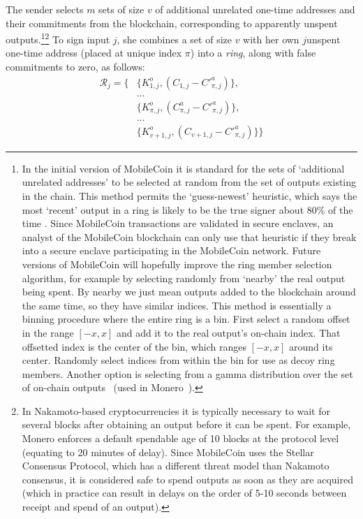 The sender selects $m$ sets of size $v$ of additional unrelated one-time addresses and their commitments from the blockchain, corresponding to apparently unspent outputs.\footnote{\label{input-selection}In the initial version of MobileCoin it is standard for the sets of `additional unrelated addresses' to be selected at random from the set of outputs existing in the chain. This method permits the `guess-newest' heuristic, which says the most `recent' output in a ring is likely to be the true signer about 80\% of the time \cite{AnalysisOfLinkability}. Since MobileCoin transactions are validated in secure enclaves, an analyst of the MobileCoin blockchain can only use that heuristic if they break into a secure enclave participating in the MobileCoin network. Future versions of MobileCoin will hopefully improve the ring member selection algorithm, for example by selecting randomly from `nearby' the real output being spent. By nearby we just mean outputs added to the blockchain around the same time, so they have similar indices. This method is essentially a binning procedure where the entire ring is a bin. First select a random offset in the range $[-x, x]$ and add it to the real output's on-chain index. That offsetted index is the center of the bin, which ranges $[-x, x]$ around its center. Randomly select indices from within the bin for use as decoy ring members. Another option is selecting from a gamma distribution over the set of on-chain outputs~\cite{AnalysisOfLinkability} (used in Monero~\cite{ztm-2}).}\footnote{In Nakamoto-based cryptocurrencies it is typically necessary to wait for several blocks after obtaining an output before it can be spent. For example, Monero enforces a default spendable age of 10 blocks at the protocol level~\cite{ztm-2} (equating to 20 minutes of delay). Since MobileCoin uses the Stellar Consensus Protocol, which has a different threat model than Nakamoto consensus, it is considered safe to spend outputs as soon as they are acquired (which in practice can result in delays on the order of 5-10 seconds between receipt and spend of an output).} To sign input $j$, she combines a set of size $v$ with her own $j$\nth unspent one-time address (placed at unique index $\pi$) into a {\em ring}, along with false commitments to zero, as follows:\vspace{.175cm}
\begin{align*}
    \mathcal{R}_j = \{&\{K^o_{1, j}, (C_{1, j} - C'^a_{\pi, j})\}, \\
    &... \\
    &\{ K^o_{\pi, j}, (C^a_{\pi, j} - C'^a_{\pi, j})\}, \\
    &... \\
    &\{ K^o_{v+1, j}, (C_{v+1, j} - C'^a_{\pi, j})\}\}
\end{align*}

